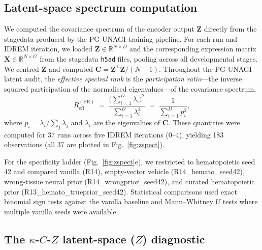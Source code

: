 \subsection*{Latent-space spectrum computation}

We computed the covariance spectrum of the encoder output $\mathbf{Z}$ directly from the stagedata produced by the PG-UNAGI training pipeline. For each run and IDREM iteration, we loaded $\mathbf{Z} \in \mathbb{R}^{N \times D}$ and the corresponding expression matrix $\mathbf{X} \in \mathbb{R}^{N \times G}$ from the stagedata \texttt{h5ad} files, pooling across all developmental stages. We centred $\mathbf{Z}$ and computed $\mathbf{C} = \mathbf{Z}^\top\mathbf{Z}/(N-1)$. Throughout the PG-UNAGI latent audit, the \emph{effective spectral rank} is the \emph{participation ratio}---the inverse squared participation of the normalised eigenvalues---of the covariance spectrum,
\begin{equation}
R_{\mathrm{eff}}^{(\mathrm{PR})}
\;=\; \frac{\bigl(\sum_{i=1}^{D}\lambda_i\bigr)^2}{\sum_{i=1}^{D}\lambda_i^2}
\;=\; \frac{1}{\sum_{i=1}^{D} p_i^2},
\end{equation}
where $p_i = \lambda_i / \sum_j \lambda_j$ and $\lambda_i$ are the eigenvalues of $\mathbf{C}$. These quantities were computed for 37 runs across five IDREM iterations (0--4), yielding 183 observations (all 37 are plotted in Fig.~\ref{fig:zspect}).

For the specificity ladder (Fig.~\ref{fig:zspect}e), we restricted to hematopoietic seed 42 and compared vanilla (R14), empty-vector vehicle (R14\_hemato\_seed42), wrong-tissue neural prior (R14\_wrongprior\_seed42), and curated hematopoietic prior (R13\_hemato\_trueprior\_seed42). Statistical comparisons used exact binomial sign tests against the vanilla baseline and Mann--Whitney $U$ tests where multiple vanilla seeds were available.

\subsection*{The $\kappa$-$C$-$Z$ latent-space ($Z$) diagnostic}


